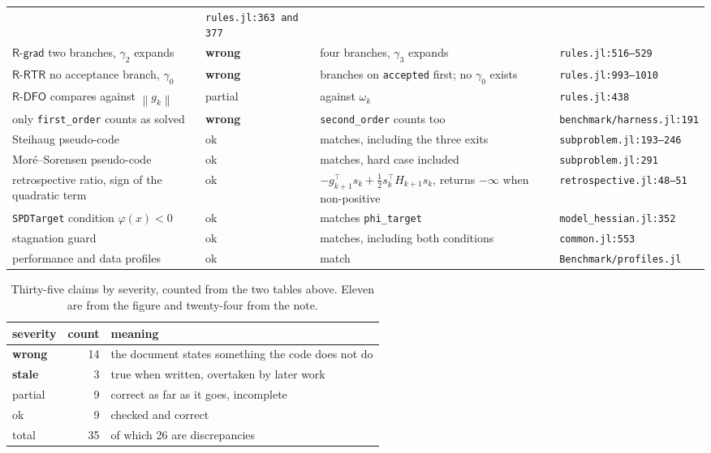 \documentclass[11pt,a4paper]{article}
\providecommand{\norm}[1]{\left \lVert #1 \right \rVert}
\providecommand{\Rdfo}{\textsf{R-DFO}}
\providecommand{\Rgrad}{\textsf{R-grad}}
\providecommand{\Rrtr}{\textsf{R-RTR}}
\newcommand{\WRONG}{\textcolor{red!70!black}{\textbf{wrong}}}
\newcommand{\STALE}{\textcolor{orange!75!black}{\textbf{stale}}}
\newcommand{\PART}{\textcolor{black!60}{partial}}
\begin{document}
\begin{longtable}{p{} p{} p{} p{}}
    & \texttt{rules.jl:363 and 377} \\
  $\Rgrad$ two branches, $\gamma_2$ expands & \WRONG
    & four branches, $\gamma_3$ expands & \texttt{rules.jl:516--529} \\
  $\Rrtr$ no acceptance branch, $\gamma_0$ & \WRONG
    & branches on \texttt{accepted} first; no $\gamma_0$ exists
    & \texttt{rules.jl:993--1010} \\
  $\Rdfo$ compares against $\norm{g_k}$ & \PART
    & against $\omega_k$ & \texttt{rules.jl:438} \\
  only \texttt{first\_order} counts as solved & \WRONG
    & \texttt{second\_order} counts too & \texttt{benchmark/harness.jl:191} \\
  Steihaug pseudo-code & ok & matches, including the three exits
    & \texttt{subproblem.jl:193--246} \\
  Mor\'e--Sorensen pseudo-code & ok & matches, hard case included
    & \texttt{subproblem.jl:291} \\
  retrospective ratio, sign of the quadratic term & ok
    & $-g_{k+1}^{\!\top}s_k + \tfrac12 s_k^{\!\top}H_{k+1}s_k$, returns $-\infty$
      when non-positive & \texttt{retrospective.jl:48--51} \\
  \texttt{SPDTarget} condition $\varphi(x) < 0$ & ok
    & matches \texttt{phi\_target} & \texttt{model\_hessian.jl:352} \\
  stagnation guard & ok & matches, including both conditions
    & \texttt{common.jl:553} \\
  performance and data profiles & ok & match
    & \texttt{Benchmark/profiles.jl} \\
  \bottomrule
\end{longtable}

\begin{table}[H]
  \centering\small
  \caption{Thirty-five claims by severity, counted from the two tables above.
    Eleven are from the figure and twenty-four from the note.}
  \label{tab: severity}
  \begin{tabular}{lrl}
    \toprule
    severity & count & meaning \\
    \midrule
    \WRONG   & 14 & the document states something the code does not do \\
    \STALE   &  3 & true when written, overtaken by later work \\
    \PART    &  9 & correct as far as it goes, incomplete \\
    ok       &  9 & checked and correct \\
    \midrule
    total    & 35 & of which 26 are discrepancies \\
    \bottomrule
  \end{tabular}
\end{table}
\end{document}
